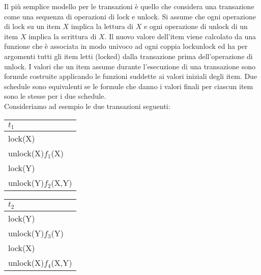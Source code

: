 Il più semplice modello per le transazioni è quello che considera una transazione come una
sequenza di operazioni di lock e unlock. Si assume che ogni operazione di lock su un item $X$ implica
la lettura di $X$ e ogni operazione di unlock di un item $X$ implica la scrittura di $X$. Il nuovo valore
dell’item viene calcolato da una funzione che è associata in modo univoco ad ogni coppia lockunlock
ed ha per argomenti tutti gli item letti (locked) dalla transazione prima dell’operazione di
unlock. I valori che un item assume durante l’esecuzione di una transazione sono formule costruite
applicando le funzioni suddette ai valori iniziali degli item. Due schedule sono equivalenti se le
formule che danno i valori finali per ciascun item sono le stesse per i due schedule.\\
Consideriamo ad esempio le due transazioni seguenti:

\begin{multicols}{2}   

 \begin{tabular}{|l|}
     \hline
     $t_1$\\
     \hline
     lock(X)\\ 
     unlock(X)$f_1$(X)\\ 
     lock(Y)\\ 
     unlock(Y)$f_2$(X,Y)\\ 
    \hline
 \end{tabular}
 
  \begin{tabular}{|l|}
    \hline
     $t_2$\\
     \hline
      lock(Y)\\
      unlock(Y)$f_3$(Y)\\
      lock(X)\\
      unlock(X)$f_4$(X,Y)\\
    \hline
    \end{tabular}  
  \end{multicols}

